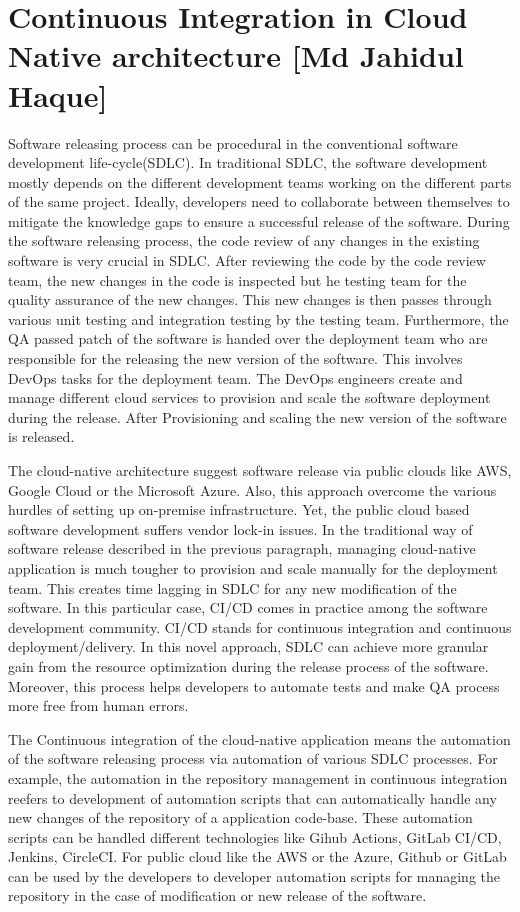 \section{Continuous Integration in Cloud Native architecture [Md Jahidul Haque]}\label{sec:jahidul_sec_1}

Software releasing process can be procedural in the conventional software development life-cycle(SDLC). In traditional SDLC, the software development mostly depends on the different development teams working on the different parts of the same project. Ideally, developers need to collaborate between themselves to mitigate the knowledge gaps to ensure a successful release of the software. During the software releasing process, the code review of any changes in the existing software is very crucial in SDLC. After reviewing the code by the code review team, the new changes in the code is inspected but he testing team for the quality assurance of the new changes. This new changes is then passes through various unit testing and  integration testing by the testing team. Furthermore, the QA passed patch of the software is handed over the deployment team who are responsible for the releasing the new version of the software. This involves DevOps tasks for the deployment team. The DevOps engineers create and manage different cloud services to provision and scale the software deployment during the release. After Provisioning and scaling the new version of the software is released. 

The cloud-native architecture suggest software release via public clouds like AWS, Google Cloud or the Microsoft Azure. Also, this approach overcome the various hurdles of setting up on-premise infrastructure. Yet, the public cloud based software development  suffers vendor lock-in issues. In the traditional way of software release described in the previous paragraph, managing cloud-native application is much tougher to provision and scale manually for the deployment team. This creates time lagging in SDLC for any new modification of the software. In this particular case, CI/CD comes in practice among the software development community. CI/CD stands for continuous integration and continuous deployment/delivery. In this novel approach, SDLC can achieve more granular gain from the resource optimization during the release process of the software. Moreover, this process helps developers to automate tests and make QA process more free from human errors. 

The Continuous integration of the cloud-native application means the automation of the software releasing process via automation of various SDLC processes. For example, the automation in the repository management in continuous integration reefers to development of automation scripts that can automatically handle any new changes of the repository of a application code-base. These automation scripts can be handled different technologies like Gihub Actions, GitLab CI/CD, Jenkins, CircleCI. For public cloud like the AWS or the Azure, Github or GitLab can be used by the developers to developer automation scripts for managing the repository in the case of modification or new release of the software.


